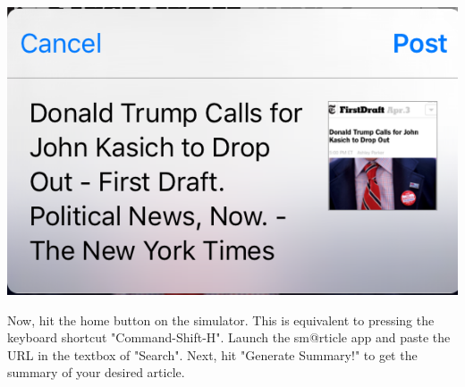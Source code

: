 \documentclass[11pt, margin=1in]{article}
\begin{document}
\begin{center}
\includegraphics[scale=0.7]{12.jpg}
\end{center}

\newpage 

Now, hit the home button on the simulator.  This is equivalent to pressing the keyboard shortcut "Command-Shift-H".  Launch the sm@rticle app and paste the URL in the textbox of "Search".  Next, hit "Generate Summary!" to get the summary of your desired article.    
\end{document}
